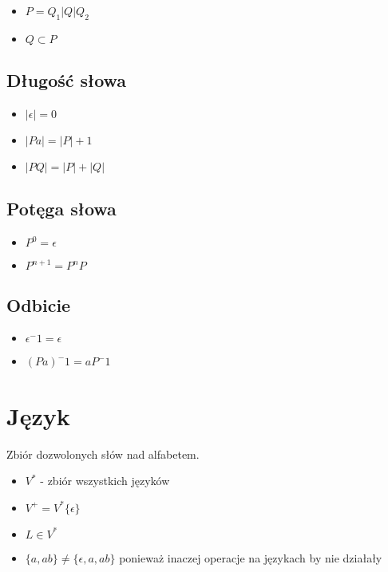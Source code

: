 \documentclass{../notatki}
\begin{document}
\begin{itemize}
  \item $P = Q_1 | Q | Q_2$
  \item $Q \subset P$
\end{itemize}

\subsection{Długość słowa}

\begin{itemize}
  \item $|\epsilon| = 0$
  \item $|Pa| = |P| + 1$
  \item $|PQ| = |P| + |Q|$
\end{itemize}

\subsection{Potęga słowa}

\begin{itemize}
  \item $P^0 = \epsilon$
  \item $P^{n + 1} = P^nP$
\end{itemize}

\subsection{Odbicie}

\begin{itemize}
  \item $\epsilon^-1 = \epsilon$
  \item $(Pa)^-1 = aP^-1$
\end{itemize}

\section{Język}

Zbiór dozwolonych słów nad alfabetem.

\begin{itemize}
  \item $V^*$ - zbiór wszystkich języków
  \item $V^+ = V^* \{\epsilon\}$
  \item $L \in V^*$
  \item $\{a, ab\} \ne \{\epsilon, a, ab\}$ ponieważ inaczej operacje
    na językach by nie działały
\end{itemize}
\end{document}
